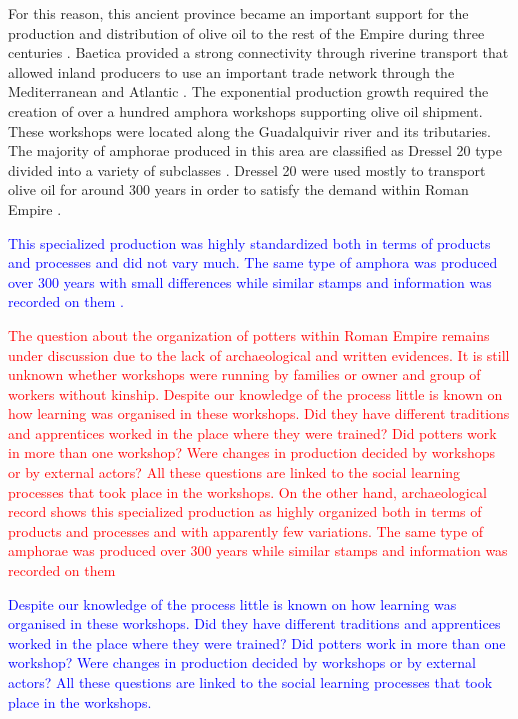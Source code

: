 \documentclass[review]{elsarticle}
\newcommand{\memo}[2]{\textcolor{#1}{#2}}
\newcommand{\maria}[1]{\memo{red}{#1\\}}
\newcommand{\revise}[1]{\memo{blue}{#1\\}}
\begin{document}
For this reason, this ancient province became an important support for the production and distribution of olive oil to the rest of the Empire during three centuries \citep{chic2005comercio, millet_anforas_1998, rodriguez_baetican_1998}. Baetica provided a strong connectivity through riverine transport that allowed inland producers to use an important trade network through the Mediterranean and Atlantic \citep{garcia_vargas_enrique_formal_2010}. The exponential production growth required the creation of over a hundred amphora workshops supporting olive oil shipment. These workshops were located along the Guadalquivir river and its tributaries. The majority of amphorae produced in this area are classified as Dressel 20 type divided into a variety of subclasses \citep{berni_millet_epigrafianforica_2008, martin-kilcher_romischen_1994}. Dressel 20 were used mostly to transport olive oil for around 300 years in order to satisfy the demand within Roman Empire \citep{rodriguez_economioleicola_1977}. 

\revise{This specialized production was highly standardized both in terms of products and processes and did not vary much. The same type of amphora was produced over 300 years with small differences while similar stamps and information was recorded on them \cite{coto-sarmiento_maria_bayesian_????}.}

\maria{The question about the organization of potters within Roman Empire remains under discussion due to the lack of archaeological and written evidences. It is still unknown whether workshops were running by families or owner and group of workers without kinship. Despite our knowledge of the process little is known on how learning was organised in these workshops. Did they have different traditions and apprentices worked in the place where they were trained? Did potters work in more than one workshop? Were changes in production decided by workshops or by external actors? All these questions are linked to the social learning processes that took place in the workshops. On the other hand, archaeological record shows this specialized production as highly organized both in terms of products and processes and with apparently few variations. The same type of amphorae was produced over 300 years while similar stamps and information was recorded on them \cite{coto-sarmiento_maria_bayesian_????}}

\revise {Despite our knowledge of the process little is known on how learning was organised in these workshops. Did they have different traditions and apprentices worked in the place where they were trained? Did potters work in more than one workshop? Were changes in production decided by workshops or by external actors? All these questions are linked to the social learning processes that took place in the workshops.}
\end{document}
